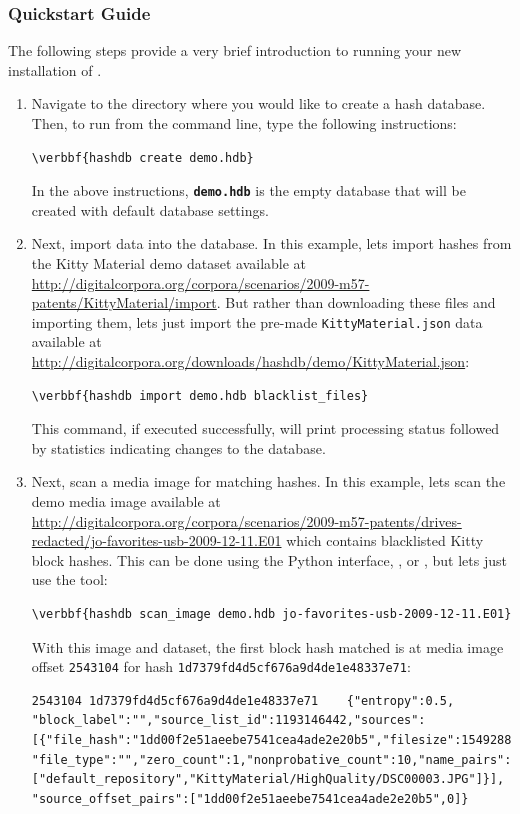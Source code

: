\documentclass[11pt,fleqn]{article} %
\begin{document}
\subsubsection{Quickstart Guide}
The following steps provide a very brief introduction to running your new installation of \hdb. 
\begin{enumerate}
\item Navigate to the directory where you would like to create a hash database. Then, to run \hdb from the command line, type the following instructions: 
\begin{Verbatim}[commandchars=\\\{\}]
\verbbf{hashdb create demo.hdb}
\end{Verbatim} 

In the above instructions, \texttt{\textbf{demo.hdb}} is the empty database that will be created with default database settings.

\item Next, import data into the database. In this example, lets import hashes from the Kitty Material demo dataset available at \url{http://digitalcorpora.org/corpora/scenarios/2009-m57-patents/KittyMaterial/import}. But rather than downloading these files and importing them, lets just import the pre-made \verb+KittyMaterial.json+ data available at \url{http://digitalcorpora.org/downloads/hashdb/demo/KittyMaterial.json}:
\begin{Verbatim}[commandchars=\\\{\}]
\verbbf{hashdb import demo.hdb blacklist_files}
\end{Verbatim} 
This command, if executed successfully, will print processing status followed by statistics indicating changes to the database.

\item Next, scan a media image for matching hashes. In this example, lets scan the demo media image available at \url{ http://digitalcorpora.org/corpora/scenarios/2009-m57-patents/drives-redacted/jo-favorites-usb-2009-12-11.E01} which contains blacklisted Kitty block hashes. This can be done using the Python interface, \sscope, or \bulk, but lets just use the \hdb tool:
\begin{Verbatim}[commandchars=\\\{\}]
\verbbf{hashdb scan_image demo.hdb jo-favorites-usb-2009-12-11.E01}
\end{Verbatim} 
With this image and dataset, the first block hash matched is at media image offset \verb+2543104+ for hash \verb+1d7379fd4d5cf676a9d4de1e48337e71+:

\begingroup
\footnotesize
\begin{Verbatim}[fontfamily=courier]
2543104	1d7379fd4d5cf676a9d4de1e48337e71	{"entropy":0.5,
"block_label":"","source_list_id":1193146442,"sources":
[{"file_hash":"1dd00f2e51aeebe7541cea4ade2e20b5","filesize":1549288,
"file_type":"","zero_count":1,"nonprobative_count":10,"name_pairs":
["default_repository","KittyMaterial/HighQuality/DSC00003.JPG"]}],
"source_offset_pairs":["1dd00f2e51aeebe7541cea4ade2e20b5",0]}
\end{Verbatim}
\endgroup

\end{enumerate}
\end{document}
